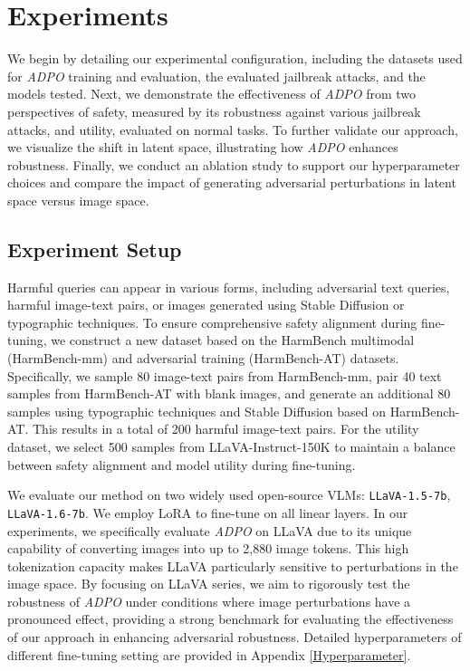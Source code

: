 \vspace{-01em}
\section{Experiments}
\vspace{-0.5em}

We begin by detailing our experimental configuration, including the datasets used for \textit{ADPO} training and evaluation, the evaluated jailbreak attacks, and the models tested. Next, we demonstrate the effectiveness of \textit{ADPO} from two perspectives of safety, measured by its robustness against various jailbreak attacks, and utility, evaluated on normal tasks. To further validate our approach, we visualize the shift in latent space, illustrating how \textit{ADPO} enhances robustness. Finally, we conduct an ablation study to support our hyperparameter choices and compare the impact of generating adversarial perturbations in latent space versus image space.


\vspace{-0.5em}
\subsection{Experiment Setup}
\vspace{-0.5em}

 Harmful queries can appear in various forms, including adversarial text queries, harmful image-text pairs, or images generated using Stable Diffusion or typographic techniques. To ensure comprehensive safety alignment during fine-tuning, we construct a new dataset based on the HarmBench multimodal (HarmBench-mm) and adversarial training (HarmBench-AT) datasets. Specifically, we sample 80 image-text pairs from HarmBench-mm, pair 40 text samples from HarmBench-AT with blank images, and generate an additional 80 samples using typographic techniques and Stable Diffusion based on HarmBench-AT. This results in a total of 200 harmful image-text pairs. For the utility dataset, we select 500 samples from LLaVA-Instruct-150K to maintain a balance between safety alignment and model utility during fine-tuning.


 We evaluate our method on two widely used open-source VLMs: \texttt{LLaVA-1.5-7b}, \texttt{LLaVA-1.6-7b}. We employ LoRA to fine-tune on all linear layers. In our experiments, we specifically evaluate \textit{ADPO} on LLaVA due to its unique capability of converting images into up to 2,880 image tokens. This high tokenization capacity makes LLaVA particularly sensitive to perturbations in the image space. By focusing on LLaVA series, we aim to rigorously test the robustness of \textit{ADPO} under conditions where image perturbations have a pronounced effect, providing a strong benchmark for evaluating the effectiveness of our approach in enhancing adversarial robustness.
Detailed hyperparameters of different fine-tuning setting are provided in Appendix \ref{Hyperparameter}.


